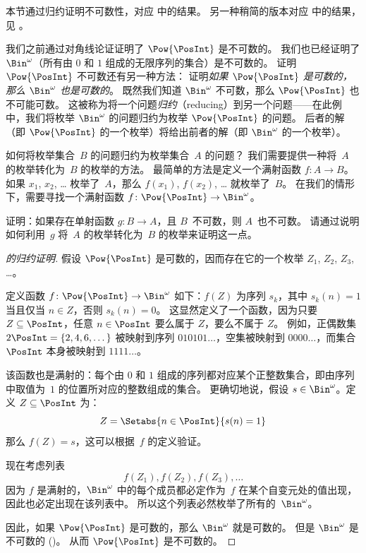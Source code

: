 \documentclass[../../../include/open-logic-section]{subfiles}
\begin{document}


\begin{editorial}
  本节通过归约证明不可数性，对应  中的结果。
  另一种稍简的版本对应  中的结果，见 。
\end{editorial}

我们之前通过对角线论证证明了 $\Pow{\PosInt}$ 是不可数的。
我们也已经证明了 $\Bin^\omega$（所有由 $0$ 和 $1$ 组成的无限序列的集合）是不可数的。
证明 $\Pow{\PosInt}$ 不可数还有另一种方法：
证明\emph{如果 $\Pow{\PosInt}$ 是可数的，那么 $\Bin^\omega$ 也是可数的}。
既然我们知道 $\Bin^\omega$ 不可数，那么 $\Pow{\PosInt}$ 也不可能可数。
这被称为将一个问题\emph{归约}（reducing）到另一个问题——在此例中，我们将枚举 $\Bin^\omega$ 的问题归约为枚举 $\Pow{\PosInt}$ 的问题。
后者的解（即 $\Pow{\PosInt}$ 的一个枚举）将给出前者的解（即 $\Bin^\omega$ 的一个枚举）。

如何将枚举集合~$B$ 的问题归约为枚举集合~$A$ 的问题？
我们需要提供一种将~$A$ 的枚举转化为~$B$ 的枚举的方法。
最简单的方法是定义一个满射函数 $f\colon A \to B$。
如果 $x_1$, $x_2$, \dots{} 枚举了~$A$，那么 $f(x_1)$, $f(x_2)$, \dots{} 就枚举了~$B$。
在我们的情形下，需要寻找一个满射函数 $f\colon \Pow{\PosInt} \to \Bin^\omega$。

\begin{prob}
证明：如果存在单射函数 $g\colon B \to A$，且 $B$~不可数，则 $A$~也不可数。
请通过说明如何利用~$g$ 将~$A$ 的枚举转化为~$B$ 的枚举来证明这一点。
\end{prob}

\begin{proof}[{} 的归约证明]
假设 $\Pow{\PosInt}$ 是可数的，因而存在它的一个枚举 $Z_{1}$, $Z_{2}$, $Z_{3}$, \dots。

定义函数 $f \colon \Pow{\PosInt} \to \Bin^\omega$ 如下：$f(Z)$ 为序列 $s_{k}$，其中 $s_{k}(n) = 1$ 当且仅当 $n \in Z$，否则 $s_k(n) = 0$。
这显然定义了一个函数，因为只要 $Z \subseteq \PosInt$，任意 $n \in \PosInt$ 要么属于 $Z$，要么不属于 $Z$。
例如，正偶数集 $2\PosInt = \{2,
4, 6, \dots\}$ 被映射到序列 $010101\dots$，空集被映射到 $0000\dots$，而集合 $\PosInt$ 本身被映射到 $1111\dots$。

该函数也是满射的：每个由 $0$ 和 $1$ 组成的序列都对应某个正整数集合，即由序列中取值为~$1$ 的位置所对应的整数组成的集合。
更确切地说，假设 $s \in \Bin^\omega$。定义 $Z \subseteq \PosInt$ 为：
\[
Z = \Setabs{n \in \PosInt}{s(n) = 1}
\]
那么 $f(Z) = s$，这可以根据~$f$ 的定义验证。

现在考虑列表
\[
f(Z_1), f(Z_2), f(Z_3), \dots
\]
因为 $f$ 是满射的，$\Bin^\omega$ 中的每个成员都必定作为~$f$ 在某个自变元处的值出现，因此也必定出现在该列表中。
所以这个列表必然枚举了所有的~$\Bin^\omega$。

因此，如果 $\Pow{\PosInt}$ 是可数的，那么 $\Bin^\omega$ 就是可数的。
但是 $\Bin^\omega$ 是不可数的 ()。
从而 $\Pow{\PosInt}$ 是不可数的。
\end{proof}
\end{document}
